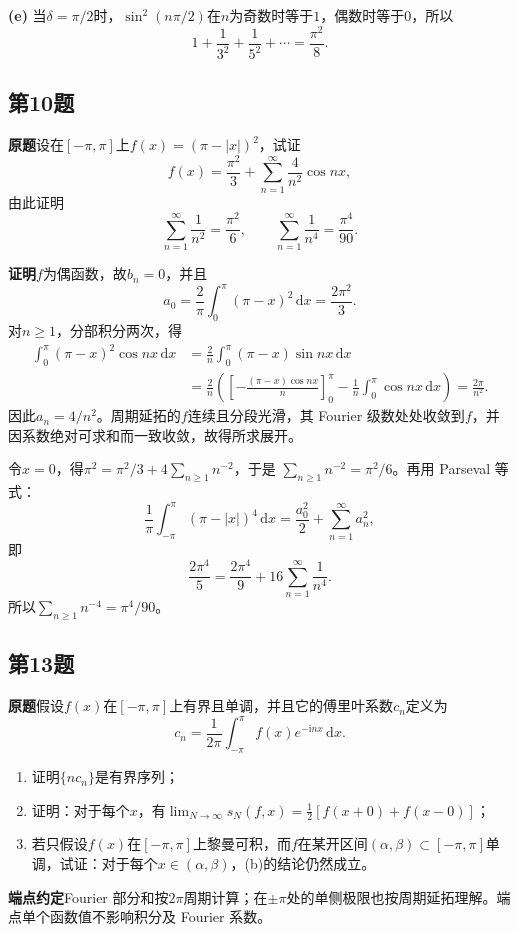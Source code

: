 \documentclass[11pt,a4paper]{ctexart}
\newcommand{\ii}{\mathrm i}
\newcommand{\dd}{\,\mathrm d}
\newcommand{\proofstart}{\par\noindent\textbf{证明}\quad}
\begin{document}
\textbf{(e)} 当$\delta=\pi/2$时，$\sin^2(n\pi/2)$在$n$为奇数时等于$1$，偶数时等于$0$，所以
\[
 \boxed{\displaystyle 1+\frac1{3^2}+\frac1{5^2}+\cdots=\frac{\pi^2}{8}.}
\]

\subsection{第10题}
\noindent\textbf{原题}\quad 设在$[-\pi,\pi]$上$f(x)=(\pi-|x|)^2$，试证
\[
 f(x)=\frac{\pi^2}{3}+\sum_{n=1}^{\infty}\frac4{n^2}\cos nx,
\]
由此证明
\[
 \sum_{n=1}^{\infty}\frac1{n^2}=\frac{\pi^2}{6},\qquad
 \sum_{n=1}^{\infty}\frac1{n^4}=\frac{\pi^4}{90}.
\]

\proofstart $f$为偶函数，故$b_n=0$，并且
\[
 a_0=\frac2\pi\int_0^\pi(\pi-x)^2\dd x=\frac{2\pi^2}{3}.
\]
对$n\ge1$，分部积分两次，得
\begin{align*}
 \int_0^\pi(\pi-x)^2\cos nx\dd x
 &=\frac2n\int_0^\pi(\pi-x)\sin nx\dd x\\
 &=\frac2n\left(\left[-\frac{(\pi-x)\cos nx}{n}\right]_0^\pi
 -\frac1n\int_0^\pi\cos nx\dd x\right)
 =\frac{2\pi}{n^2}.
\end{align*}
因此$a_n=4/n^2$。周期延拓的$f$连续且分段光滑，其 Fourier 级数处处收敛到$f$，并因系数绝对可求和而一致收敛，故得所求展开。

令$x=0$，得$\pi^2=\pi^2/3+4\sum_{n\ge1}n^{-2}$，于是
$\sum_{n\ge1}n^{-2}=\pi^2/6$。再用 Parseval 等式：
\[
 \frac1\pi\int_{-\pi}^{\pi}(\pi-|x|)^4\dd x
 =\frac{a_0^2}{2}+\sum_{n=1}^{\infty}a_n^2,
\]
即
\[
 \frac{2\pi^4}{5}=\frac{2\pi^4}{9}+16\sum_{n=1}^{\infty}\frac1{n^4}.
\]
所以$\sum_{n\ge1}n^{-4}=\pi^4/90$。

\subsection{第13题}
\noindent\textbf{原题}\quad 假设$f(x)$在$[-\pi,\pi]$上有界且单调，并且它的傅里叶系数$c_n$定义为
\[
 c_n=\frac1{2\pi}\int_{-\pi}^{\pi}f(x)e^{-\ii nx}\dd x.
\]
\begin{enumerate}
 \item[(a)] 证明$\{nc_n\}$是有界序列；
 \item[(b)] 证明：对于每个$x$，有$\displaystyle\lim_{N\to\infty}s_N(f,x)=\tfrac12[f(x+0)+f(x-0)]$；
 \item[(c)] 若只假设$f(x)$在$[-\pi,\pi]$上黎曼可积，而$f$在某开区间$(\alpha,\beta)\subset[-\pi,\pi]$单调，试证：对于每个$x\in(\alpha,\beta)$，(b)的结论仍然成立。
\end{enumerate}

\noindent\textbf{端点约定}\quad Fourier 部分和按$2\pi$周期计算；在$\pm\pi$处的单侧极限也按周期延拓理解。端点单个函数值不影响积分及 Fourier 系数。
\end{document}
